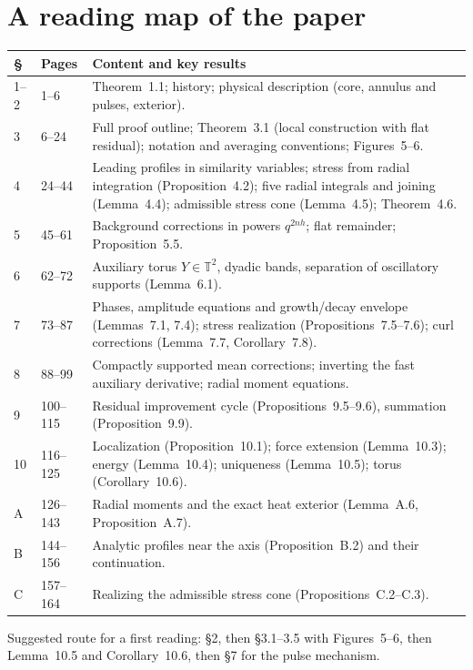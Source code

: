 \documentclass[11pt]{article}
\newcommand{\T}{\mathbb{T}}
\theoremstyle{plain}
\theoremstyle{remark}
\begin{document}
\appendix
\section{A reading map of the paper}

\begin{center}\small
\begin{tabularx}{\linewidth}{@{}l l X@{}}
\toprule
\S & Pages & Content and key results\\
\midrule
1--2 & 1--6 & Theorem~1.1; history; physical description (core, annulus and pulses, exterior).\\
3 & 6--24 & Full proof outline; Theorem~3.1 (local construction with flat residual); notation and averaging conventions; Figures~5--6.\\
4 & 24--44 & Leading profiles in similarity variables; stress from radial integration (Proposition~4.2); five radial integrals and joining (Lemma~4.4); admissible stress cone (Lemma~4.5); Theorem~4.6.\\
5 & 45--61 & Background corrections in powers $q^{2nh}$; flat remainder; Proposition~5.5.\\
6 & 62--72 & Auxiliary torus $Y\in\T^2$, dyadic bands, separation of oscillatory supports (Lemma~6.1).\\
7 & 73--87 & Phases, amplitude equations and growth/decay envelope (Lemmas~7.1, 7.4); stress realization (Propositions~7.5--7.6); curl corrections (Lemma~7.7, Corollary~7.8).\\
8 & 88--99 & Compactly supported mean corrections; inverting the fast auxiliary derivative; radial moment equations.\\
9 & 100--115 & Residual improvement cycle (Propositions~9.5--9.6), summation (Proposition~9.9).\\
10 & 116--125 & Localization (Proposition~10.1); force extension (Lemma~10.3); energy (Lemma~10.4); uniqueness (Lemma~10.5); torus (Corollary~10.6).\\
A & 126--143 & Radial moments and the exact heat exterior (Lemma~A.6, Proposition~A.7).\\
B & 144--156 & Analytic profiles near the axis (Proposition~B.2) and their continuation.\\
C & 157--164 & Realizing the admissible stress cone (Propositions~C.2--C.3).\\
\bottomrule
\end{tabularx}
\end{center}
\noindent Suggested route for a first reading: \S2, then \S3.1--3.5 with Figures~5--6, then Lemma~10.5 and Corollary~10.6, then \S7 for the pulse mechanism.
\end{document}

